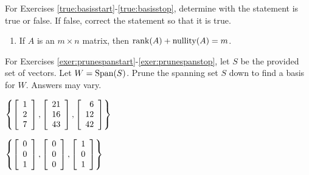 

\noindent For Exercises \ref{true:basisstart}-\ref{true:basisstop}, determine with the statement is true or false. If false, correct the statement so that it is true.
\begin{enumerate}[!HW!, start=1]
\item\label{true:basisstart}\label{true:basisstop} If $A$ is an $m\times n$ matrix, then $\operatorname*{rank}(A)+\operatorname*{nullity}(A)=m$. %
\end{enumerate}

\noindent For Exercises \ref{exer:prunespanstart}-\ref{exer:prunespanstop}, let $S$ be the provided set of vectors. Let $W = \operatorname{Span}(S)$. Prune the spanning set $S$ down to find a basis for $W$. Answers may vary. 
\begin{enumerate}[!HW!]
\begin{multicols}{2}
\item \label{exer:prunespanstart} $\left\{ \left[\begin{array}{r} 1\\2\\7 \end{array}\right], \left[\begin{array}{r} 21\\16\\43 \end{array}\right], \left[\begin{array}{r} 6\\12\\42 \end{array}\right]\right\}$ %
\item \label{exer:prunespanstop} $\left\{ \left[\begin{array}{r} 0\\0\\1 \end{array}\right], \left[\begin{array}{r} 0\\0\\0 \end{array}\right], \left[\begin{array}{r} 1\\0\\1 \end{array}\right]\right\}$ %
\end{multicols}
\end{enumerate}

